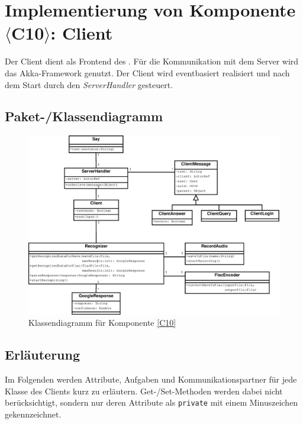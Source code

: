 \FloatBarrier


\section{Implementierung von Komponente $\langle$C10$\rangle$: Client}

Der Client dient als Frontend des \NewsGenie. Für die Kommunikation mit dem
Server wird das Akka-Framework genutzt. Der Client wird eventbasiert realisiert
und nach dem Start durch den \textit{ServerHandler} gesteuert.

\subsection{Paket-/Klassendiagramm}

\begin{figure}[ht]
\centering
\includegraphics[width=1.03\textwidth]{Systementwurf/05_implementierungsentwurf/client-objekte}
\caption{Klassendiagramm für Komponente \ref{C10}}
\end{figure}

\subsection{Erläuterung}

Im Folgenden werden Attribute, Aufgaben und Kommunikationspartner für jede
Klasse des Clients kurz zu erläutern. Get-/Set-Methoden werden dabei nicht
berücksichtigt, sondern nur deren Attribute als \texttt{private} mit einem
Minuszeichen gekennzeichnet.

